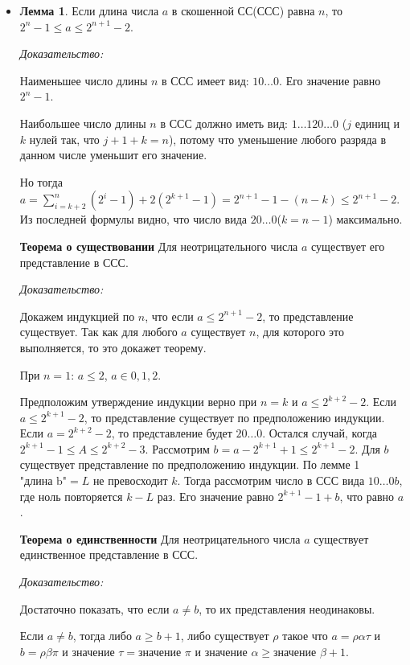 \documentclass{article}
\begin{document}
\begin{itemize}
    \item

        \textbf{Лемма 1}. Если длина числа $a$ в скошенной СС(ССС) равна $n$, то 
        $2^n-1\leq a \leq 2^{n+1}-2$.

        \textit{Доказательство:}

        Наименьшее число длины $n$ в ССС имеет вид: $10\ldots0$. Его значение
        равно $2^n-1$.

        Наибольшее число длины $n$ в ССС должно иметь вид: $1\ldots120\ldots0$
        ($j$ единиц и $k$ нулей так, что $j+1+k=n$), потому что уменьшение
        любого разряда в данном числе уменьшит его значение.

        Но тогда $a=\sum_{i=k+2}^n(2^i-1) + 2(2^{k+1}-1) = 2^{n+1}-1-(n-k)\leq2^{n+1}-2$.
        Из последней формулы видно, что число вида $20\ldots0$($k=n-1$) максимально.

        \textbf{Теорема о существовании} Для неотрицательного числа $a$ существует 
        его представление в ССС.

        \textit{Доказательство:}

        Докажем индукцией по $n$, что если $a\leq 2^{n+1}-2$, то представление
        существует. Так как для любого $a$ существует $n$, для которого это
        выполняется, то это докажет теорему.

        При $n=1$: $a \leq 2$, $a \in { 0, 1, 2 }$.

        Предположим утверждение индукции верно при $n=k$ и $a\leq2^{k+2}-2$.
        Если $a\leq2^{k+1}-2$, то представление существует по предположению
        индукции. Если $a=2^{k+2}-2$, то представление будет $20\ldots0$.
        Остался случай, когда $2^{k+1}-1\leq A\leq 2^{k+2}-3$. Рассмотрим
        $b=a-2^{k+1}+1\leq2^{k+1}-2$. Для $b$ существует представление по
        предположению индукции. По лемме 1 $\text{"длина b"} = L$ не превосходит
        $k$. Тогда рассмотрим число в ССС вида $10\ldots 0b$, где ноль повторяется
        $k-L$ раз. Его значение равно $2^{k+1}-1+b$, что равно $a$.

        \textbf{Теорема о единственности} Для неотрицательного числа $a$
        существует единственное представление в ССС.

        \textit{Доказательство:}

        Достаточно показать, что если $a \neq b$, то их представления
        неодинаковы. 

        Если $a \neq b$, тогда либо $a \geq b+1$, либо существует $\rho$ 
        такое что $a=\rho\alpha\tau$ и $b=\rho\beta\pi$ и $\text{значение }\tau = \text{значение }\pi$ и
        $\text{значение }\alpha \geq \text{значение }\beta + 1$.


\end{itemize}
\end{document}

